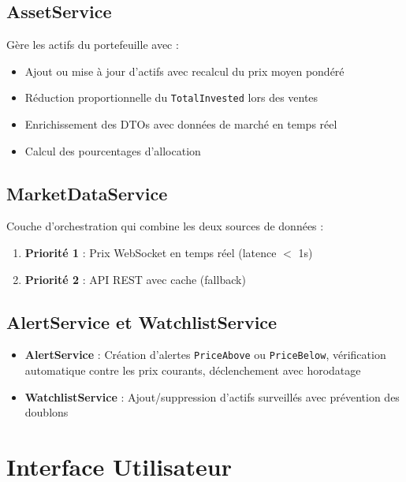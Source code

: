 \documentclass[12pt,a4paper]{article}
\begin{document}
\subsection{AssetService}

Gère les actifs du portefeuille avec :
\begin{itemize}
    \item Ajout ou mise à jour d'actifs avec recalcul du prix moyen pondéré
    \item Réduction proportionnelle du \texttt{TotalInvested} lors des ventes
    \item Enrichissement des DTOs avec données de marché en temps réel
    \item Calcul des pourcentages d'allocation
\end{itemize}

\subsection{MarketDataService}

Couche d'orchestration qui combine les deux sources de données :

\begin{enumerate}
    \item \textbf{Priorité 1} : Prix WebSocket en temps réel (latence $<$ 1s)
    \item \textbf{Priorité 2} : API REST avec cache (fallback)
\end{enumerate}

\subsection{AlertService et WatchlistService}

\begin{itemize}
    \item \textbf{AlertService} : Création d'alertes \texttt{PriceAbove} ou \texttt{PriceBelow}, vérification automatique contre les prix courants, déclenchement avec horodatage
    \item \textbf{WatchlistService} : Ajout/suppression d'actifs surveillés avec prévention des doublons
\end{itemize}

\section{Interface Utilisateur}
\end{document}
